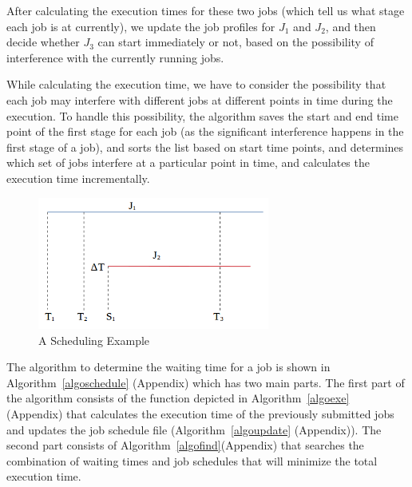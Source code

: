 \noindent
After calculating the execution times for these two jobs (which tell us what stage each job is at currently), we update the job profiles for $J_1$ and $J_2$, and then decide whether $J_3$ can start immediately or not, based on the possibility of interference with the currently running jobs. 

\noindent
While calculating the execution time, we have to consider the possibility that each job may interfere with different jobs at different points in time during the execution. To handle this possibility, the algorithm saves the start and end time point of the first stage for each job (as the significant interference happens in the first stage of a job), and sorts the list based on start time points, and determines which set of jobs interfere at a particular point in time, and calculates the execution time incrementally. 

\begin{figure}[!t]
\centering
\captionsetup{justification=centering}
\includegraphics[width=3in]{ScheExample.png}
\caption{A Scheduling Example}
\label{scheexample}
\end{figure}




\noindent




\noindent
The algorithm to determine the waiting time for a job is shown in Algorithm~\ref{algoschedule} (Appendix) which has two main parts. The first part of the algorithm consists of the function depicted in Algorithm~\ref{algoexe} (Appendix) that calculates the execution time of the previously submitted jobs and updates the job schedule file (Algorithm~\ref{algoupdate} (Appendix)). The second part consists of Algorithm~\ref{algofind}(Appendix) that searches the combination of waiting times and job schedules that will minimize the total execution time. 











